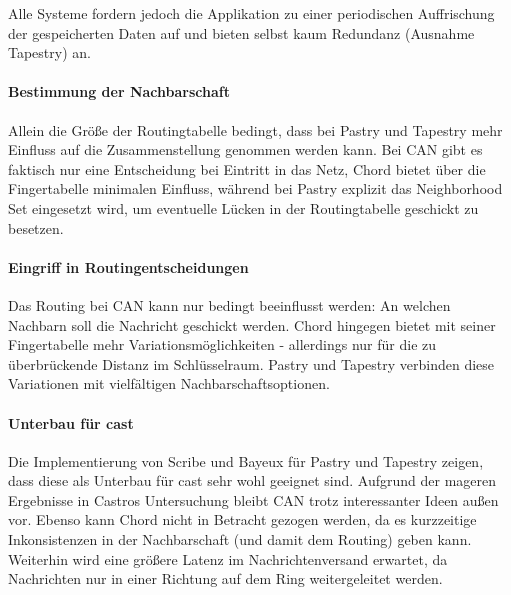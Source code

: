 Alle Systeme fordern jedoch die Applikation zu einer periodischen Auffrischung der gespeicherten Daten auf und bieten selbst kaum Redundanz (Ausnahme Tapestry) an.


\paragraph{Bestimmung der Nachbarschaft}
Allein die Größe der Routingtabelle bedingt, dass bei Pastry und Tapestry mehr Einfluss auf die Zusammenstellung genommen werden kann. Bei CAN gibt es faktisch nur eine Entscheidung bei Eintritt in das Netz, Chord bietet über die Fingertabelle minimalen Einfluss, während bei Pastry explizit das Neighborhood Set eingesetzt wird, um eventuelle Lücken in der Routingtabelle geschickt zu besetzen.

\paragraph{Eingriff in Routingentscheidungen}
Das Routing bei CAN kann nur bedingt beeinflusst werden: An welchen Nachbarn soll die Nachricht geschickt werden. Chord hingegen bietet mit seiner Fingertabelle mehr Variationsmöglichkeiten - allerdings nur für die zu überbrückende Distanz im Schlüsselraum. Pastry und Tapestry verbinden diese Variationen mit vielfältigen Nachbarschaftsoptionen.

\paragraph{Unterbau für \ac{cast}}
Die Implementierung von Scribe und Bayeux für Pastry und Tapestry zeigen, dass diese als Unterbau für \ac{cast} sehr wohl geeignet sind. Aufgrund der mageren Ergebnisse in Castros Untersuchung \cite{Castro2003Evaluation} bleibt CAN trotz interessanter Ideen außen vor. Ebenso kann Chord nicht in Betracht gezogen werden, da es kurzzeitige Inkonsistenzen in der Nachbarschaft (und damit dem Routing) geben kann. Weiterhin wird eine größere Latenz im Nachrichtenversand erwartet, da Nachrichten nur in einer Richtung auf dem Ring weitergeleitet werden.

